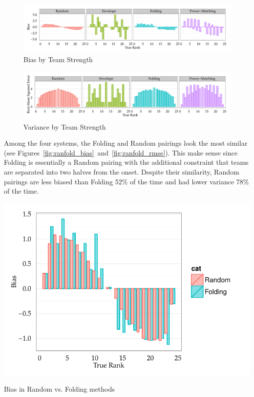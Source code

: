\documentclass{tufte-handout}
\begin{document}
\begin{figure}[h]
  \includegraphics[width=\linewidth]{bias_teamRank.pdf}%
  \caption{Bias by Team Strength}%
  \label{fig:bias_teamRank}%
\end{figure}

\begin{figure}[h]
  \includegraphics[width=\linewidth]{rmse_teamRank.pdf}%
  \caption{Variance by Team Strength}%
    \label{fig:rmse_teamRank}%
\end{figure}

Among the four systems, the Folding and Random pairings look the most similar (see Figures~\ref{fig:ranfold_bias}~and~\ref{fig:ranfold_rmse}). This make sense since Folding is essentially a Random pairing with the additional constraint that teams are separated into two halves from the onset. Despite their similarity, Random pairings are less biased than Folding 52\% of the time and had lower variance 78\% of the time.

\begin{marginfigure}%
  \includegraphics[width=\linewidth]{bias_ranfold.pdf}
  \caption{Bias in Random vs. Folding methods}
  \label{fig:ranfold_bias}
\end{marginfigure}
\end{document}
